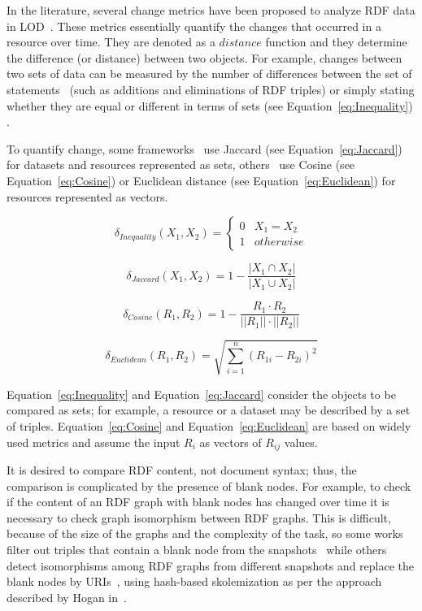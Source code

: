 \documentclass[sw]{iosart2x}
\begin{document}
In the literature, several change metrics have been proposed to analyze RDF data in LOD~\cite{UmbrichHHPD10, NishiokaS15}. These metrics essentially quantify the changes that occurred in a resource over time. They are denoted as a $distance$ function and they determine the difference (or distance) between two objects. For example, changes between two sets of data can be measured by the number of differences between the set of statements~\cite{DividinoGSG14} (such as additions and eliminations of RDF triples) or simply stating whether they are equal or different in terms of sets (see Equation~\ref{eq:Inequality}) \cite{UmbrichHHPD10}.

To quantify change, some frameworks~\cite{DividinoGSG14, NishiokaS15} use Jaccard (see Equation~\ref{eq:Jaccard}) for datasets and resources represented as sets, others~\cite{NishiokaS16} use Cosine (see Equation~\ref{eq:Cosine}) or Euclidean distance (see Equation~\ref{eq:Euclidean}) for resources represented as vectors.

\begin{equation}
\label{eq:Inequality}
\delta_{Inequality}(X_1, X_2) = 
\begin{cases} 
0 & X_1 = X_2 \\
1 & otherwise 
\end{cases}
\end{equation}

\begin{equation}
\label{eq:Jaccard}
\delta_{Jaccard}(X_1, X_2) = 1-\frac{|X_1 \cap X_2|}{|X_1 \cup X_2|}
\end{equation}

\begin{equation}
\label{eq:Cosine}
\delta_{Cosine}(R_1, R_2) = 1-\frac{R_1 \cdot R_2}{||R_1|| \cdot ||R_2||}
\end{equation}

\begin{equation}
\label{eq:Euclidean}
\delta_{Euclidean}(R_1, R_2) = \sqrt{\sum_{i=1}^n (R_{1i} - R_{2i})^2}
\end{equation}

Equation~\ref{eq:Inequality} and Equation~\ref{eq:Jaccard} consider the objects to be compared as sets; for example, a resource or a dataset may be described by a set of triples. Equation~\ref{eq:Cosine} and Equation~\ref{eq:Euclidean} are based on widely used metrics and assume the input $R_i$ as vectors of $R_{ij}$ values.

It is desired to compare RDF content, not document syntax; thus, the comparison is complicated by the presence of blank nodes. For example, to check if the content of an RDF graph with blank nodes has changed over time it is necessary to check graph isomorphism between RDF graphs. This is difficult, because of the size of the graphs and the complexity of the task, so some works filter out triples that contain a blank node from the snapshots~\cite{NishiokaS18, KaferAUOH13} while others detect isomorphisms among RDF graphs from different snapshots and replace the blank nodes by URIs~\cite{UmbrichHHPD10}, using hash-based skolemization as per the approach described by Hogan in~\cite{Hogan15}.
\end{document}
